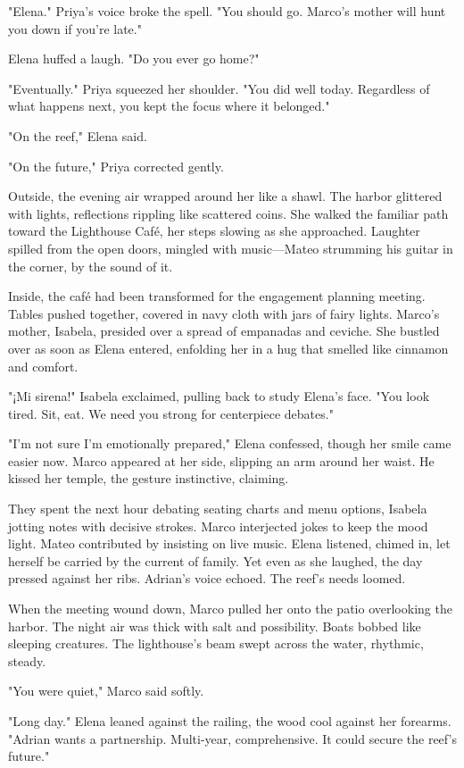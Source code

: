 "Elena." Priya's voice broke the spell. "You should go. Marco's mother will hunt you down if you're late."

Elena huffed a laugh. "Do you ever go home?"

"Eventually." Priya squeezed her shoulder. "You did well today. Regardless of what happens next, you kept the focus where it belonged."

"On the reef," Elena said.

"On the future," Priya corrected gently.

Outside, the evening air wrapped around her like a shawl. The harbor glittered with lights, reflections rippling like scattered coins. She walked the familiar path toward the Lighthouse Café, her steps slowing as she approached. Laughter spilled from the open doors, mingled with music—Mateo strumming his guitar in the corner, by the sound of it.

Inside, the café had been transformed for the engagement planning meeting. Tables pushed together, covered in navy cloth with jars of fairy lights. Marco's mother, Isabela, presided over a spread of empanadas and ceviche. She bustled over as soon as Elena entered, enfolding her in a hug that smelled like cinnamon and comfort.

"¡Mi sirena!" Isabela exclaimed, pulling back to study Elena's face. "You look tired. Sit, eat. We need you strong for centerpiece debates."

"I'm not sure I'm emotionally prepared," Elena confessed, though her smile came easier now. Marco appeared at her side, slipping an arm around her waist. He kissed her temple, the gesture instinctive, claiming.

They spent the next hour debating seating charts and menu options, Isabela jotting notes with decisive strokes. Marco interjected jokes to keep the mood light. Mateo contributed by insisting on live music. Elena listened, chimed in, let herself be carried by the current of family. Yet even as she laughed, the day pressed against her ribs. Adrian's voice echoed. The reef's needs loomed.

When the meeting wound down, Marco pulled her onto the patio overlooking the harbor. The night air was thick with salt and possibility. Boats bobbed like sleeping creatures. The lighthouse's beam swept across the water, rhythmic, steady.

"You were quiet," Marco said softly.

"Long day." Elena leaned against the railing, the wood cool against her forearms. "Adrian wants a partnership. Multi-year, comprehensive. It could secure the reef's future."

